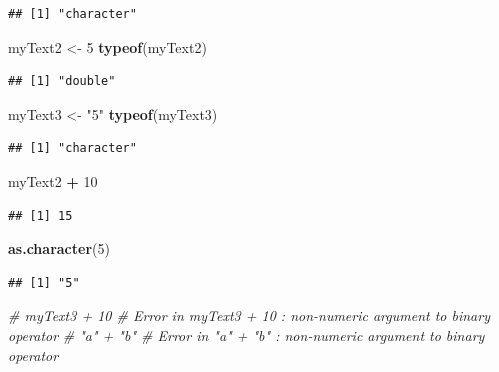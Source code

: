 \documentclass[]{book}
\newenvironment{Shaded}{\begin{snugshade}}{\end{snugshade}}
\newcommand{\CommentTok}[1]{\textcolor[rgb]{0.56,0.35,0.01}{\textit{#1}}}
\newcommand{\DecValTok}[1]{\textcolor[rgb]{0.00,0.00,0.81}{#1}}
\newcommand{\KeywordTok}[1]{\textcolor[rgb]{0.13,0.29,0.53}{\textbf{#1}}}
\newcommand{\NormalTok}[1]{#1}
\newcommand{\OperatorTok}[1]{\textcolor[rgb]{0.81,0.36,0.00}{\textbf{#1}}}
\newcommand{\StringTok}[1]{\textcolor[rgb]{0.31,0.60,0.02}{#1}}
\begin{document}
\begin{verbatim}
## [1] "character"
\end{verbatim}

\begin{Shaded}
\begin{Highlighting}[]
\NormalTok{myText2 <-}\StringTok{ }\DecValTok{5}
\KeywordTok{typeof}\NormalTok{(myText2)}
\end{Highlighting}
\end{Shaded}

\begin{verbatim}
## [1] "double"
\end{verbatim}

\begin{Shaded}
\begin{Highlighting}[]
\NormalTok{myText3 <-}\StringTok{ "5"}
\KeywordTok{typeof}\NormalTok{(myText3)}
\end{Highlighting}
\end{Shaded}

\begin{verbatim}
## [1] "character"
\end{verbatim}

\begin{Shaded}
\begin{Highlighting}[]
\NormalTok{myText2 }\OperatorTok{+}\StringTok{ }\DecValTok{10}
\end{Highlighting}
\end{Shaded}

\begin{verbatim}
## [1] 15
\end{verbatim}

\begin{Shaded}
\begin{Highlighting}[]
\KeywordTok{as.character}\NormalTok{(}\DecValTok{5}\NormalTok{)}
\end{Highlighting}
\end{Shaded}

\begin{verbatim}
## [1] "5"
\end{verbatim}

\begin{Shaded}
\begin{Highlighting}[]
\CommentTok{# myText3 + 10 # Error in myText3 + 10 : non-numeric argument to binary operator}
\CommentTok{# "a" + "b" # Error in "a" + "b" : non-numeric argument to binary operator}
\end{Highlighting}
\end{Shaded}
\end{document}

